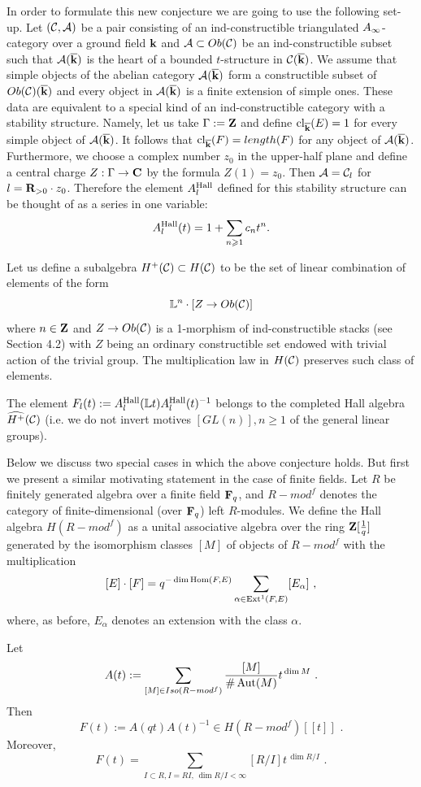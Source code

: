 \documentclass[12pt]{article}
\begin{document}
In order to formulate this new conjecture we are going to use the following set-up. Let $({{\mathcal C}},{\cal A})$ be a pair consisting of an ind-constructible triangulated $A_{\infty}$-category over a ground field ${\bf k}$ and ${\cal A}\subset Ob({{\mathcal C}})$ be an ind-constructible subset such that ${\cal A}(\overline{{\bf k}})$ is the heart of a bounded $t$-structure in ${{\mathcal C}}(\overline{{\bf k}})$. We assume that simple objects of the abelian category ${\cal A}(\overline{{\bf k}})$ form a constructible subset of $Ob({{\mathcal C}})(\overline{{\bf k}})$ and every object in ${\cal A}(\overline{{\bf k}})$ is a finite extension of simple ones. These data are equivalent to a special kind of an ind-constructible category with a stability structure. Namely, let us take $\Gamma:={\bf Z}$ and define $\operatorname{cl}_{\overline{{\bf k}}}(E)=1$ for every simple object of ${\cal A}(\overline{{\bf k}})$. It follows that $\operatorname{cl}_{\overline{{\bf k}}}(F)=length(F)$ for any object of ${\cal A}(\overline{{\bf k}})$. Furthermore, we choose a complex number $z_0$ in the upper-half plane and define a central charge $Z:\Gamma\to {\bf C}$ by the formula $Z(1)=z_0$. Then ${\cal A}={\mathcal C}_l$ for $l={\bf R}_{>0}\cdot z_0$. Therefore the element $A_l^{\operatorname{Hall}}$ defined for this stability structure can be thought of as a series in one variable:
$$A_l^{\operatorname{Hall}}(t)=1+\sum_{n\geqslant 1}c_nt^n.$$

Let us define a subalgebra $H^+({\mathcal C}) \subset H({\mathcal C})$ to be the set of linear combination of elements of the form
  $${\mathbb L}^n \cdot [Z\to Ob({\mathcal C})]$$
where $n\in {\bf Z}$ and $Z\to Ob({\mathcal C})$ is a 1-morphism of ind-constructible stacks (see Section 4.2) with $Z$ being an ordinary constructible set endowed with trivial action of the trivial group. The multiplication law in $H({\mathcal C})$ preserves such class of elements.

\begin{conj} The element $F_l(t):=A_l^{\operatorname{Hall}}({\mathbb L}t)A_l^{\operatorname{Hall}}(t)^{-1}$ belongs to the completed Hall algebra
$\widehat{H^+}({\mathcal C})$ (i.e. we do not invert motives $[GL(n)], n\geqslant 1$ of the general linear groups).


\end{conj}


Below we discuss two special cases in which the above conjecture holds. But first we present a similar motivating statement in the case of finite fields.
Let $R$ be finitely generated algebra over a finite field ${\bf F}_q$, and $R-mod^f$ denotes the category of finite-dimensional (over ${\bf F}_q$) left $R$-modules. We define the Hall algebra $H(R-mod^f)$ as a unital associative algebra over the ring ${\bf Z}[{1\over{q}}]$ generated by the isomorphism classes $[M]$ of objects of $R-mod^f$
with the multiplication
$$[E]\cdot [F]=q^{-\dim \operatorname{Hom}(F,E)}\sum_{\alpha\in \operatorname{Ext}^1(F,E)}[E_{\alpha}]\,\,,$$
where, as before, $ E_{\alpha}$ denotes an extension with the class $\alpha$.
\begin{prp}
Let
$$A(t):=\sum_{[M]\in Iso(R-mod^f)}{[M]\over{\#\operatorname{Aut}(M)}}t^{\,\dim M}\,\,.$$
Then
$$F(t):=A(qt)A(t)^{-1}\in H(R-mod^f)[[t]]\,\,.$$
Moreover,
$$F(t)=\sum_{I\subset R, I=RI,\, \dim R/I<\infty}[R/I]t^{\,\dim R/I}\,\,.$$



\end{prp}
\end{document}
